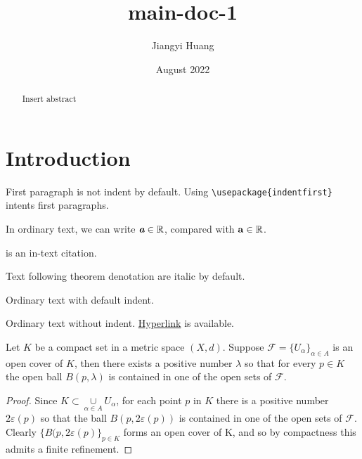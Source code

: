 \documentclass{article}
\title{main-doc-1}
\author{Jiangyi Huang}
\date{August 2022}
\begin{document}
\maketitle

\begin{abstract}
Insert abstract
\end{abstract}


\section{Introduction}

First paragraph is not indent by default. Using \texttt{\textbackslash usepackage\{indentfirst\}} intents first paragraphs.

In ordinary text, we can write $\textbf{\em a} \in \mathbb{R}$, compared with $\mathbf{a} \in \mathbb{R}$.

\mydef \cite{einstein} is an in-text citation.

Text following theorem denotation are italic by default.

\rm %

Ordinary text with default indent.

\noindent Ordinary text without indent. \href{https://www.overleaf.com/learn/latex/Hyperlinks}{Hyperlink} is available.

\thm Let $K$ be a compact set in a metric space $(X,d)$. Suppose $\mathcal{F}=\{U_\alpha\}_{\alpha \in A}$ is an open cover of $K$, then there exists a positive number $\lambda$ so that for every $p \in K$ the open ball $B(p,\lambda)$ is contained in one of the open sets of $\mathcal{F}$.

\begin{proof}

Since $K \subset \underset{\alpha \in A}\cup U_\alpha$, for each point $p$ in $K$ there is a positive number $2\varepsilon(p)$ so that the ball $B(p,2\varepsilon(p))$ is contained in one of the open sets of $\mathcal{F}$. Clearly $\{B(p,2\varepsilon(p)\}_{p \in K}$ forms an open cover of K, and so by compactness this admits a finite refinement.

\end{proof}

\newpage


\end{document}
